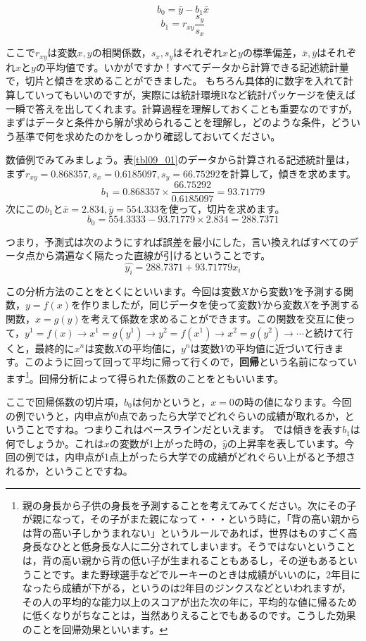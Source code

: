 \documentclass{ltjbook}
\begin{document}
\[ b_0 = \bar{y}-b_1\bar{x} \]
\[ b_1 = r_{xy}\frac{s_y}{s_x} \]

ここで$r_{xy}$は変数$x,y$の相関係数，$s_x,s_y$はそれぞれ$x$と$y$の標準偏差，$\bar{x},\bar{y}$はそれぞれ$x$と$y$の平均値です。いかがですか！すべてデータから計算できる記述統計量で，切片と傾きを求めることができました。
もちろん具体的に数字を入れて計算していってもいいのですが，実際には統計環境Rなど統計パッケージを使えば一瞬で答えを出してくれます。計算過程を理解しておくことも重要なのですが，まずはデータと条件から解が求められることを理解し，どのような条件，どういう基準で何を求めたのかをしっかり確認しておいてください。

数値例でみてみましょう。表\ref{tbl09_01}のデータから計算される記述統計量は，まず$r_{xy}=0.868357,s_x=0.6185097,s_y=66.75292$を計算して，傾きを求めます。
\[ b_1 = 0.868357 \times \frac{66.75292}{0.6185097} = 93.71779 \]
次にこの$b_1$と$\bar{x} = 2.834,\bar{y}=554.333$を使って，切片を求めます。
\[ b_0 = 554.3333 - 93.71779 \times 2.834 = 288.7371 \]

つまり，予測式は次のようにすれば誤差を最小にした，言い換えればすべてのデータ点から満遍なく隔たった直線が引けるということです。
\[ \hat{y_i} = 288.7371 + 93.71779 x_i \]

この分析方法のことをとくにといいます。今回は変数$X$から変数$Y$を予測する関数，$y=f(x)$を作りましたが，同じデータを使って変数$Y$から変数$X$を予測する関数，$x=g(y)$を考えて係数を求めることができます。この関数を交互に使って，$y^1 = f(x) \to x^1 = g(y^1) \to y^2 = f(x^1) \to x^2 = g(y^2) \to \cdots $と続けて行くと，最終的に$x^n$は変数$X$の平均値に，$y^n$は変数$Y$の平均値に近づいて行きます。このように回って回って平均に帰って行くので，\textbf{回帰}という名前になっています\footnote{親の身長から子供の身長を予測することを考えてみてください。次にその子が親になって，その子がまた親になって・・・という時に，「背の高い親からは背の高い子しかうまれない」というルールであれば，世界はものすごく高身長なひとと低身長な人に二分されてしまいます。そうではないということは，背の高い親から背の低い子が生まれることもあるし，その逆もあるということです。また野球選手などでルーキーのときは成績がいいのに，2年目になったら成績が下がる，というのは2年目のジンクスなどといわれますが，その人の平均的な能力以上のスコアが出た次の年に，平均的な値に帰るために低くなりがちなことは，当然ありえることでもあるのです。こうした効果のことを回帰効果といいます。}。回帰分析によって得られた係数のことをともいいます。

ここで回帰係数の切片項，$b_0$は何かというと，$x=0$の時の値になります。今回の例でいうと，内申点が0点であったら大学でどれぐらいの成績が取れるか，ということですね。つまりこれはベースラインだといえます。
では傾きを表す$b_1$は何でしょうか。これは$x$の変数が1上がった時の，$\hat{y}$の上昇率を表しています。今回の例では，内申点が1点上がったら大学での成績がどれぐらい上がると予想されるか，ということですね。
\end{document}
